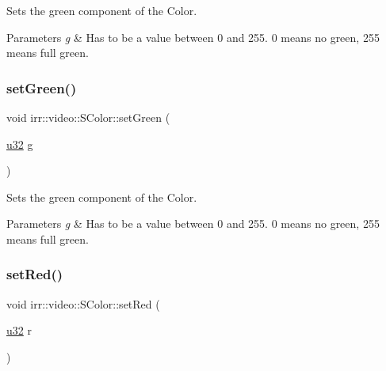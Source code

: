 Sets the green component of the Color. 


\begin{DoxyParams}{Parameters}
{\em g} & Has to be a value between 0 and 255. 0 means no green, 255 means full green. \\
\hline
\end{DoxyParams}
\mbox{\label{classirr_1_1video_1_1SColor_af80cfedd5e761216b8bed259963ac948}} 
\subsubsection{\texorpdfstring{set\+Green()}{setGreen()}\hspace{0.1cm}{\footnotesize\ttfamily [2/2]}}
{\footnotesize\ttfamily void irr\+::video\+::\+S\+Color\+::set\+Green (\begin{DoxyParamCaption}\item[{\hyperlink{namespaceirr_a0416a53257075833e7002efd0a18e804}{u32}}]{g }\end{DoxyParamCaption})\hspace{0.3cm}{\ttfamily [inline]}}



Sets the green component of the Color. 


\begin{DoxyParams}{Parameters}
{\em g} & Has to be a value between 0 and 255. 0 means no green, 255 means full green. \\
\hline
\end{DoxyParams}
\mbox{\label{classirr_1_1video_1_1SColor_a950c98714711ae9dd8c5219f83c07693}} 
\subsubsection{\texorpdfstring{set\+Red()}{setRed()}\hspace{0.1cm}{\footnotesize\ttfamily [1/2]}}
{\footnotesize\ttfamily void irr\+::video\+::\+S\+Color\+::set\+Red (\begin{DoxyParamCaption}\item[{\hyperlink{namespaceirr_a0416a53257075833e7002efd0a18e804}{u32}}]{r }\end{DoxyParamCaption})\hspace{0.3cm}{\ttfamily [inline]}}




